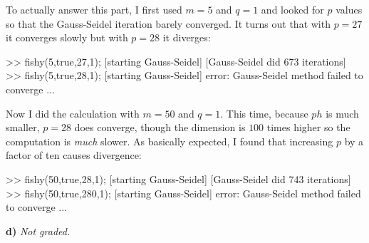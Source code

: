 \documentclass[11pt]{amsart}
\newcommand{\epart}[1]{\medskip\noindent\textbf{#1)}}
\begin{document}
To actually answer this part, I first used $m=5$ and $q=1$ and looked for $p$ values so that the Gauss-Seidel iteration barely converged.  It turns out that with $p=27$ it converges slowly but with $p=28$ it diverges:
\begin{mVerb}
>> fishy(5,true,27,1);
[starting Gauss-Seidel]
[Gauss-Seidel did 673 iterations]
>> fishy(5,true,28,1);
[starting Gauss-Seidel]
error: Gauss-Seidel method failed to converge
...
\end{mVerb}

Now I did the calculation with $m=50$ and $q=1$.  This time, because $ph$ is much smaller, $p=28$ does converge, though the dimension is $100$ times higher so the computation is \emph{much} slower.  As basically expected, I found that increasing $p$ by a factor of ten causes divergence:
\begin{mVerb}
>> fishy(50,true,28,1);
[starting Gauss-Seidel]
[Gauss-Seidel did 743 iterations]
>> fishy(50,true,280,1);
[starting Gauss-Seidel]
error: Gauss-Seidel method failed to converge
...
\end{mVerb}

\epart{d}  \emph{Not graded.}
\end{document}
